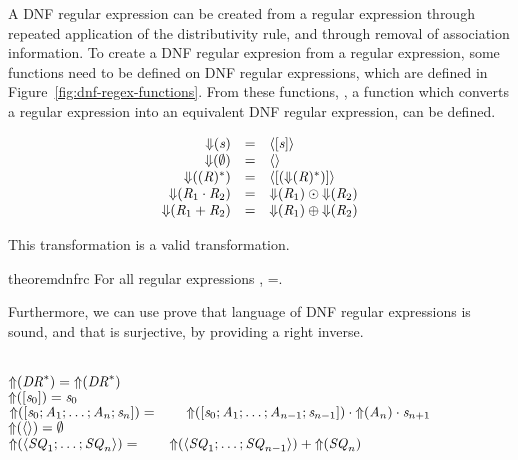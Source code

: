 A DNF regular expression can be created from a regular expression through repeated
application of the distributivity rule, and through removal of association information.
To create a DNF regular expresion from a regular expression,
some functions need to be defined on DNF regular expressions,
which are defined in Figure~\ref{fig:dnf-regex-functions}.
From these functions, \ToDNFRegex{}, a function which converts a regular expression into
an equivalent DNF regular expression, can be defined.

\begin{definition}
\leavevmode
\[
\begin{array}{rcl}
\mathit{\Downarrow}(\mathit{s}) & = & \langle[\mathit{s}]\rangle\\
\mathit{\Downarrow}(\emptyset) & = & \langle\rangle\\
\mathit{\Downarrow}((\mathit{R})^*) & = & \langle[(\mathit{\Downarrow}(\mathit{R})^*)]\rangle\\
\mathit{\Downarrow}(\mathit{R}_1\cdot\mathit{R}_2) & = & \mathit{\Downarrow}(\mathit{R}_1) \odot \mathit{\Downarrow}(\mathit{R}_2)\\
\mathit{\Downarrow}(\mathit{R}_1+\mathit{R}_2) & = & \mathit{\Downarrow}(\mathit{R}_1) \oplus \mathit{\Downarrow}(\mathit{R}_2)\\
\end{array}
\]
\end{definition}
This transformation is a valid transformation.
\begin{restatable}{theorem}{dnfrc}
\label{thm:completeness-dnf-lenses}
For all regular expressions \Regex{},
\LanguageOf{\ToDNFRegex(\Regex)}=\LanguageOf{\Regex{}}.
\end{restatable}

Furthermore, we can use prove that language of DNF regular expressions is sound,
and that \ToDNFRegex{} is surjective, by providing a right inverse.

\begin{definition}\leavevmode\\
$\mathit{\Uparrow}(\mathit{DR}^*) = \mathit{\Uparrow}(\mathit{DR}^*)$\\
$\mathit{\Uparrow}([\mathit{s}_0]) = \mathit{s}_0$\\
$\mathit{\Uparrow}([\mathit{s}_0;\mathit{A}_1;\ldots
;\mathit{A}_n;\mathit{s}_n]) =\\
\hspace*{2em}\mathit{\Uparrow}([\mathit{s}_0;\mathit{A}_1;
\ldots;\mathit{A}_{n-1};\mathit{s}_{n-1}])
\cdot \mathit{\Uparrow}(\mathit{A}_n) \cdot \mathit{s}_{n+1}$\\
$\mathit{\Uparrow}(\langle\rangle)=\emptyset$\\
$\mathit{\Uparrow}(\langle\mathit{SQ}_1;\ldots;\mathit{SQ}_n\rangle)=\\
\hspace*{2em}\mathit{\Uparrow}(\langle\mathit{SQ}_1;\ldots;\mathit{SQ}_{n-1}\rangle)
+ \mathit{\Uparrow}(\mathit{SQ}_n)$
\end{definition}

